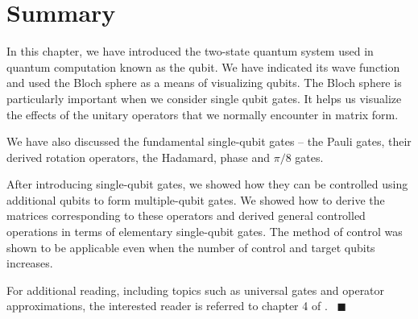 \section{Summary}

In this chapter, we have introduced the two-state quantum system used in quantum computation known as the qubit. We have indicated its wave function and used the Bloch sphere as a means of visualizing qubits. The Bloch sphere is particularly important when we consider single qubit gates. It helps us visualize the effects of the unitary operators that we normally encounter in matrix form.

We have also discussed the fundamental single-qubit gates -- the Pauli gates, their derived rotation operators, the Hadamard, phase and $\pi/8$ gates.

After introducing single-qubit gates, we showed how they can be controlled using additional qubits to form multiple-qubit gates. We showed how to derive the matrices corresponding to these operators and derived general controlled operations in terms of elementary single-qubit gates. The method of control was shown to be applicable even when the number of control and target qubits increases.

For additional reading, including topics such as universal gates and operator approximations, the interested reader is referred to chapter 4 of \cite{nielsen2000}.
~\hfill$\blacksquare$
